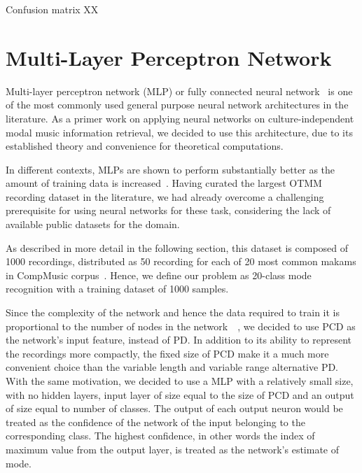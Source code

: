 \documentclass{sig-alternate}
\begin{document}
Confusion matrix XX


\section{Multi-Layer Perceptron Network}\label{sec:neuralnet}
Multi-layer perceptron network (MLP) or fully connected neural network~\cite{neural_textbook} is one of the most commonly used general purpose neural network architectures in the literature. As a primer work on applying neural networks on culture-independent modal music information retrieval, we decided to use this architecture, due to its established theory and convenience for theoretical computations. 

In different contexts, MLPs are shown to perform substantially better as the amount of training data is increased~\cite{ciresan}. Having curated the largest OTMM recording dataset in the literature, we had already overcome a challenging prerequisite for using neural networks for these task, considering the lack of available public datasets for the domain.

As described in more detail in the following section, this dataset is composed of 1000 recordings, distributed as 50 recording for each of 20 most common makams in CompMusic corpus~\cite{compmusic_corpus}. Hence, we define our problem as 20-class mode recognition with a training dataset of 1000 samples.

Since the complexity of the network and hence the data required to train it is proportional to the number of nodes in the network~\cite{vc-dimension}~\cite{bartlett}, we decided to use PCD as the network's input feature, instead of PD. In addition to its ability to represent the recordings more compactly, the fixed size of PCD make it a much more convenient choice than the variable length and variable range alternative PD. With the same motivation, we decided to use a MLP with a relatively small size, with no hidden layers, input layer of size equal to the size of PCD and an output of size equal to number of classes. The output of each output neuron would be treated as the confidence of the network of the input belonging to the corresponding class. The highest confidence, in other words the index of maximum value from the output layer, is treated as the network's estimate of mode.
\end{document}
